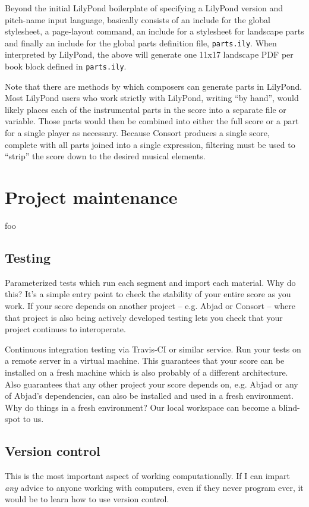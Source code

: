 \noindent Beyond the initial LilyPond boilerplate of specifying a LilyPond
version and pitch-name input language, basically consists of an include for the
global stylesheet, a page-layout command, an include for a stylesheet for
landscape parts and finally an include for the global parts definition file,
\texttt{parts.ily}. When interpreted by LilyPond, the above will generate one
11x17 landscape PDF per book block defined in \texttt{parts.ily}.

Note that there are methods by which composers can generate parts in
LilyPond. Most LilyPond users who work strictly with LilyPond, writing
\enquote{by hand}, would likely places each of the instrumental parts in the
score into a separate file or variable. Those parts would then be combined into
either the full score or a part for a single player as necessary. Because
Consort produces a single score, complete with all parts joined into a single
expression, filtering must be used to \enquote{strip} the score down to the
desired musical elements.

\section{Project maintenance}
\label{sec:project-maintenance}

foo

\subsection{Testing}
\label{ssec:testing}

Parameterized tests which run each segment and import each material. Why do
this? It's a simple entry point to check the stability of your entire score as
you work. If your score depends on another project -- e.g. Abjad or Consort --
where that project is also being actively developed testing lets you check that
your project continues to interoperate.

Continuous integration testing via Travis-CI or similar service. Run your tests
on a remote server in a virtual machine. This guarantees that your score can be
installed on a fresh machine which is also probably of a different
architecture. Also guarantees that any other project your score depends on,
e.g. Abjad or any of Abjad's dependencies, can also be installed and used in a
fresh environment. Why do things in a fresh environment? Our local workspace
can become a blind-spot to us.

\subsection{Version control}
\label{ssec:version-control}

This is the most important aspect of working computationally. If I can impart
\emph{any} advice to anyone working with computers, even if they never program
ever, it would be to learn how to use version control.